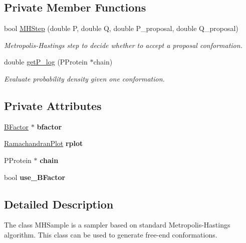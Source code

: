 \subsection*{Private Member Functions}
\begin{DoxyCompactItemize}
\item 
bool \hyperlink{classMHSampler_a36f466ea9201e93ea3eb71a4f2063a60}{M\-H\-Step} (double P, double Q, double P\-\_\-proposal, double Q\-\_\-proposal)
\begin{DoxyCompactList}\small\item\em Metropolis-\/\-Hastings step to decide whether to accept a proposal conformation. \end{DoxyCompactList}\item 
double \hyperlink{classMHSampler_afe35e0ae0a4947a384b609c22f3f32fe}{get\-P\-\_\-log} (P\-Protein $\ast$chain)
\begin{DoxyCompactList}\small\item\em Evaluate probability density given one conformation. \end{DoxyCompactList}\end{DoxyCompactItemize}
\subsection*{Private Attributes}
\begin{DoxyCompactItemize}
\item 
\hypertarget{classMHSampler_a4445f1e47f03f4ce46aec20e53d0b37c}{\hyperlink{classBFactor}{B\-Factor} $\ast$ {\bfseries bfactor}}\label{classMHSampler_a4445f1e47f03f4ce46aec20e53d0b37c}

\item 
\hypertarget{classMHSampler_a2ad6faf428663daa72b99bdc74206001}{\hyperlink{classRamachandranPlot}{Ramachandran\-Plot} {\bfseries rplot}}\label{classMHSampler_a2ad6faf428663daa72b99bdc74206001}

\item 
\hypertarget{classMHSampler_a67283d544597d06cca5bedcb173ce8c4}{P\-Protein $\ast$ {\bfseries chain}}\label{classMHSampler_a67283d544597d06cca5bedcb173ce8c4}

\item 
\hypertarget{classMHSampler_a12f29b8e5530202ceb3a785f0a7a93a2}{bool {\bfseries use\-\_\-\-B\-Factor}}\label{classMHSampler_a12f29b8e5530202ceb3a785f0a7a93a2}

\end{DoxyCompactItemize}


\subsection{Detailed Description}
The class M\-H\-Sample is a sampler based on standard Metropolis-\/\-Hastings algorithm. This class can be used to generate free-\/end conformations. 

